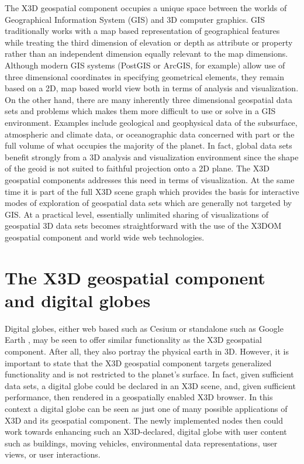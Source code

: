 \documentclass{acmsiggraph}                     %
\begin{document}
The X3D geospatial component occupies a unique space between the worlds of Geographical Information
System (GIS) and 3D computer graphics. GIS traditionally works with a map based representation of
geographical features while treating the third dimension of elevation or depth as attribute or
property rather than an independent dimension equally relevant to the map dimensions. Although
modern GIS systems (PostGIS or ArcGIS\texttrademark, for example) allow use of three dimensional coordinates in
specifying geometrical elements, they remain based on a 2D, map based world view both in terms of
analysis and visualization. On the other hand, there are many inherently three dimensional
geospatial data sets and problems which makes them more difficult to use or solve in a GIS
environment.  Examples include geological and geophysical data of the subsurface, atmospheric and
climate data, or oceanographic data concerned with part or the full volume of what occupies the
majority of the planet. In fact, global data sets benefit strongly from a 3D analysis and
visualization environment since the shape of the geoid is not suited to faithful projection onto a
2D plane. The X3D geospatial components addresses this need in terms of visualization. At the same
time it is part of the full X3D scene graph which provides the basis for interactive modes of
exploration of geospatial data sets which are generally not targeted by GIS. At a practical level,
essentially unlimited sharing of visualizations of geospatial 3D data sets becomes straightforward
with the use of the X3DOM geospatial component and world wide web technologies.


\section{The X3D geospatial component and digital globes}

Digital globes, either web based such as Cesium \cite{cesium15} or standalone such as Google Earth
\cite{googleearth15}, may be seen to offer similar functionality as the X3D geospatial component.
After all, they also portray the physical earth in 3D. However, it is important to state that the
X3D geospatial component targets generalized functionality and is not restricted to the planet's
surface. In fact, given sufficient data sets, a digital globe could be declared in an X3D scene,
and, given sufficient performance, then rendered in a geospatially enabled X3D browser. In this
context a digital globe can be seen as just one of many possible applications of X3D and its
geospatial component. The newly implemented nodes then could work towards enhancing such an
X3D-declared, digital globe with user content such as buildings, moving vehicles, environmental 
data representations, user views, or user interactions.
\end{document}
